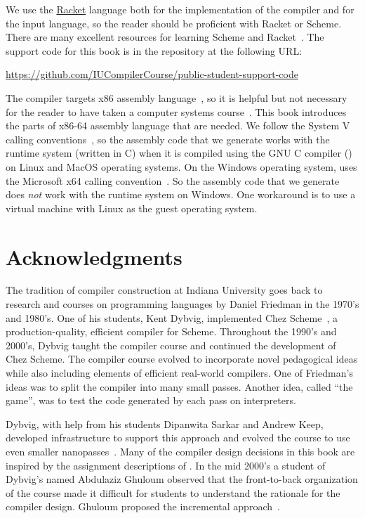\documentclass[7x10]{TimesAPriori_MIT}%
\begin{document}
We use the \href{https://racket-lang.org/}{Racket} language both for
the implementation of the compiler and for the input language, so the
reader should be proficient with Racket or Scheme. There are many
excellent resources for learning Scheme and
Racket~\citep{Dybvig:1987aa,Abelson:1996uq,Friedman:1996aa,Felleisen:2001aa,Felleisen:2013aa,Flatt:2014aa}. The
support code for this book is in the  repository at the
following URL:
\begin{center}\small
  \url{https://github.com/IUCompilerCourse/public-student-support-code}
\end{center}

The compiler targets x86 assembly language~\citep{Intel:2015aa}, so it
is helpful but not necessary for the reader to have taken a computer
systems course~\citep{Bryant:2010aa}. This book introduces the parts
of x86-64 assembly language that are needed.
%
We follow the System V calling
conventions~\citep{Bryant:2005aa,Matz:2013aa}, so the assembly code
that we generate works with the runtime system (written in C) when it
is compiled using the GNU C compiler () on Linux and MacOS
operating systems.
%
On the Windows operating system,  uses the Microsoft x64
calling convention~\citep{Microsoft:2018aa,Microsoft:2020aa}. So the
assembly code that we generate does \emph{not} work with the runtime
system on Windows. One workaround is to use a virtual machine with
Linux as the guest operating system.

\section*{Acknowledgments}

The tradition of compiler construction at Indiana University goes back
to research and courses on programming languages by Daniel Friedman in
the 1970's and 1980's.  One of his students, Kent Dybvig, implemented
Chez Scheme~\citep{Dybvig:2006aa}, a production-quality, efficient
compiler for Scheme.  Throughout the 1990's and 2000's, Dybvig taught
the compiler course and continued the development of Chez Scheme.
%
The compiler course evolved to incorporate novel pedagogical ideas
while also including elements of efficient real-world compilers.  One
of Friedman's ideas was to split the compiler into many small
passes. Another idea, called ``the game'', was to test the code
generated by each pass on interpreters.

Dybvig, with help from his students Dipanwita Sarkar and Andrew Keep,
developed infrastructure to support this approach and evolved the
course to use even smaller
nanopasses~\citep{Sarkar:2004fk,Keep:2012aa}.  Many of the compiler
design decisions in this book are inspired by the assignment
descriptions of \citet{Dybvig:2010aa}. In the mid 2000's a student of
Dybvig's named Abdulaziz Ghuloum observed that the front-to-back
organization of the course made it difficult for students to
understand the rationale for the compiler design. Ghuloum proposed the
incremental approach~\citep{Ghuloum:2006bh}.
\end{document}
